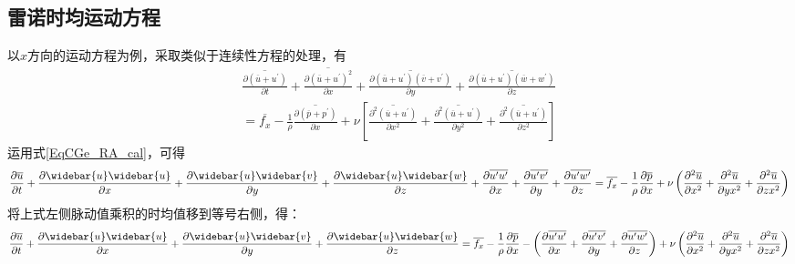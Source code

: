 \subsection{雷诺时均运动方程}
以$x$方向的运动方程为例，采取类似于连续性方程的处理，有
\begin{equation*}
  \begin{aligned}
  \overline{
    \frac{\partial (\overline{u}+u^{\prime})}{\partial t}
  }
  +
  \overline{
    \frac{\partial (\overline{u}+u^{\prime})^{2}}{\partial x}
  }
  +
  \overline{
    \frac{\partial (\overline{u}+u^{\prime})(\overline{v}+v^{\prime})}{\partial y}
  }
  +
  \overline{
    \frac{\partial (\overline{u}+u^{\prime})(\overline{w}+w^{\prime})}{\partial z}
  }
  \\
  =
  \overline{f_{x}}
  -\frac{1}{\rho}
  \overline{
    \frac{\partial (\overline{p}+p^{\prime})}{\partial x}
  }
  +
  \nu
  \left[
  \overline{
    \frac{\partial^{2} (\overline{u}+u^{\prime})}{\partial x^{2}}
  }
  +
  \overline{
    \frac{\partial^{2} (\overline{u}+u^{\prime})}{\partial y^{2}}
  }
  +
  \overline{
    \frac{\partial^{2} (\overline{u}+u^{\prime})}{\partial z^{2}}
  }
    \right ]
  \end{aligned}
\end{equation*}
运用式\eqref{EqCGe_RA_cal}，可得
\begin{equation*}
  \frac{\partial \overline{u}}{\partial t} +
  \frac{\partial \widebar{u}\widebar{u}}{\partial x} +
  \frac{\partial \widebar{u}\widebar{v}}{\partial y} +
  \frac{\partial \widebar{u}\widebar{w}}{\partial z} +
  \frac{\partial \overline{u^{\prime}u^{\prime}}}{\partial x} +
  \frac{\partial \overline{u^{\prime}v^{\prime}}}{\partial y} +
  \frac{\partial \overline{u^{\prime}w^{\prime}}}{\partial z} 
  =
  \overline{f_{x}}
  -\frac{1}{\rho}\frac{\partial \overline{p}}{\partial x} +
  \nu
  \left(
    \frac{\partial^{2} \overline{u}}{\partial x^{2}} +
  \frac{\partial^{2} \overline{u}}{\partial y x^{2}} +
  \frac{\partial^{2} \overline{u}}{\partial z x^{2}} 
\right)
\end{equation*}
将上式左侧脉动值乘积的时均值移到等号右侧，得：
\begin{equation}
  \frac{\partial \overline{u}}{\partial t} +
  \frac{\partial \widebar{u}\widebar{u}}{\partial x} +
  \frac{\partial \widebar{u}\widebar{v}}{\partial y} +
  \frac{\partial \widebar{u}\widebar{w}}{\partial z} 
  =
  \overline{f_{x}}
  -\frac{1}{\rho}\frac{\partial \overline{p}}{\partial x} -
  \left(
  \frac{\partial \overline{u^{\prime}u^{\prime}}}{\partial x} +
  \frac{\partial \overline{u^{\prime}v^{\prime}}}{\partial y} +
  \frac{\partial \overline{u^{\prime}w^{\prime}}}{\partial z} 
\right)
+
  \nu
  \left(
    \frac{\partial^{2} \overline{u}}{\partial x^{2}} +
  \frac{\partial^{2} \overline{u}}{\partial y x^{2}} +
  \frac{\partial^{2} \overline{u}}{\partial z x^{2}} 
\right)
\label{EqCGe_Ra_Me_temp1}
\end{equation}
